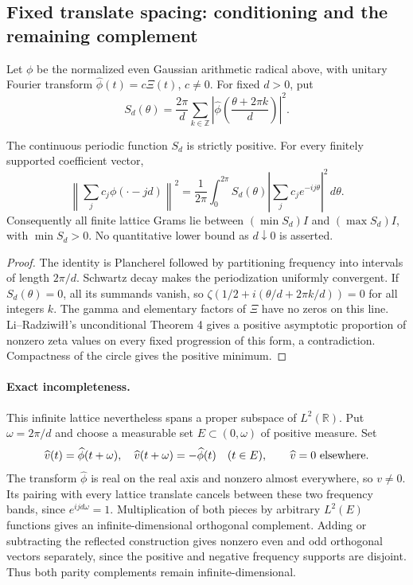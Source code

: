 \subsection*{Fixed translate spacing: conditioning and the remaining complement}
\label{ns46-a2-sec-lattice}
Let $\phi$ be the normalized even Gaussian arithmetic radical above,
with unitary Fourier transform $\widehat\phi(t)=c\Xi(t)$, $c\ne0$.
For fixed $d>0$, put
\[
 S_d(\theta)=\frac{2\pi}{d}\sum_{k\in\mathbb Z}
       \left|\widehat\phi\left(\frac{\theta+2\pi k}{d}\right)\right|^2.
\]
\begin{proposition}
\label{ns46-a2-prop-lattice}
The continuous periodic function $S_d$ is strictly positive.
For every finitely supported coefficient vector,
\[
 \left\|\sum_jc_j\phi(\cdot-jd)\right\|^2
 =\frac1{2\pi}\int_0^{2\pi}S_d(\theta)
             \left|\sum_jc_je^{-ij\theta}\right|^2\,d\theta.
\]
Consequently all finite lattice Grams lie between
$(\min S_d)I$ and $(\max S_d)I$, with $\min S_d>0$.
No quantitative lower bound as $d\downarrow0$ is asserted.
\end{proposition}
\begin{proof}
The identity is Plancherel followed by partitioning frequency into
intervals of length $2\pi/d$. Schwartz decay makes the periodization
uniformly convergent. If $S_d(\theta)=0$, all its summands vanish,
so $\zeta(1/2+i(\theta/d+2\pi k/d))=0$ for all integers $k$.
The gamma and elementary factors of $\Xi$ have no zeros on this
line. Li--Radziwi\l\l's unconditional Theorem 4
\cite{ns46-LiRadziwill2015} gives a positive asymptotic proportion
of nonzero zeta values on every fixed progression of this form,
a contradiction. Compactness of the circle gives the positive minimum.
\end{proof}

\paragraph{Exact incompleteness.}
This infinite lattice nevertheless spans a proper subspace of
$L^2(\mathbb R)$. Put $\omega=2\pi/d$ and choose a measurable set
$E\subset(0,\omega)$ of positive measure. Set
\[
 \widehat v(t)=\widehat\phi(t+\omega),\quad
 \widehat v(t+\omega)=-\widehat\phi(t)\quad(t\in E),
 \qquad \widehat v=0\ \hbox{elsewhere}.
\]
The transform $\widehat\phi$ is real on the real axis and nonzero
almost everywhere, so $v\ne0$. Its pairing with every lattice
translate cancels between these two frequency bands, since
$e^{ijd\omega}=1$. Multiplication of both pieces by arbitrary
$L^2(E)$ functions gives an infinite-dimensional orthogonal complement.
Adding or subtracting the reflected construction gives nonzero even
and odd orthogonal vectors separately, since the positive and negative
frequency supports are disjoint. Thus both parity complements remain
infinite-dimensional.

